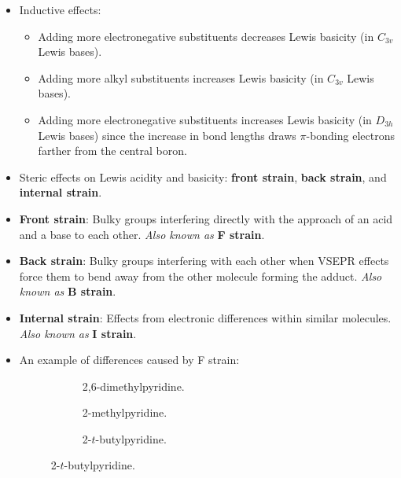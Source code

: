 \documentclass[../notes.tex]{subfiles}
\begin{document}
\begin{itemize}
    \item Inductive effects:
    \begin{itemize}
        \item Adding more electronegative substituents decreases Lewis basicity (in $C_{3v}$ Lewis bases).
        \item Adding more alkyl substituents increases Lewis basicity (in $C_{3v}$ Lewis bases).
        \item Adding more electronegative substituents increases Lewis basicity (in $D_{3h}$ Lewis bases) since the increase in bond lengths draws $\pi$-bonding electrons farther from the central boron.
    \end{itemize}
    \item Steric effects on Lewis acidity and basicity: \textbf{front strain}, \textbf{back strain}, and \textbf{internal strain}.
    \item \textbf{Front strain}: Bulky groups interfering directly with the approach of an acid and a base to each other. \emph{Also known as} \textbf{F strain}.
    \item \textbf{Back strain}: Bulky groups interfering with each other when VSEPR effects force them to bend away from the other molecule forming the adduct. \emph{Also known as} \textbf{B strain}.
    \item \textbf{Internal strain}: Effects from electronic differences within similar molecules. \emph{Also known as} \textbf{I strain}.
    \item An example of differences caused by F strain:
    \begin{figure}[h!]
        \centering
        \begin{subfigure}[b]{0.24\linewidth}
            \centering
            \caption{2,6-dimethylpyridine.}
            \label{fig:4Lewisbasesa}
        \end{subfigure}
        \begin{subfigure}[b]{0.24\linewidth}
            \centering
            \caption{2-methylpyridine.}
            \label{fig:4Lewisbasesb}
        \end{subfigure}
        \begin{subfigure}[b]{0.24\linewidth}
            \centering
            \caption{2-$t$-butylpyridine.}
            \label{fig:4Lewisbasesc}
        \end{subfigure}

\end{figure}
\end{itemize}
\end{document}

